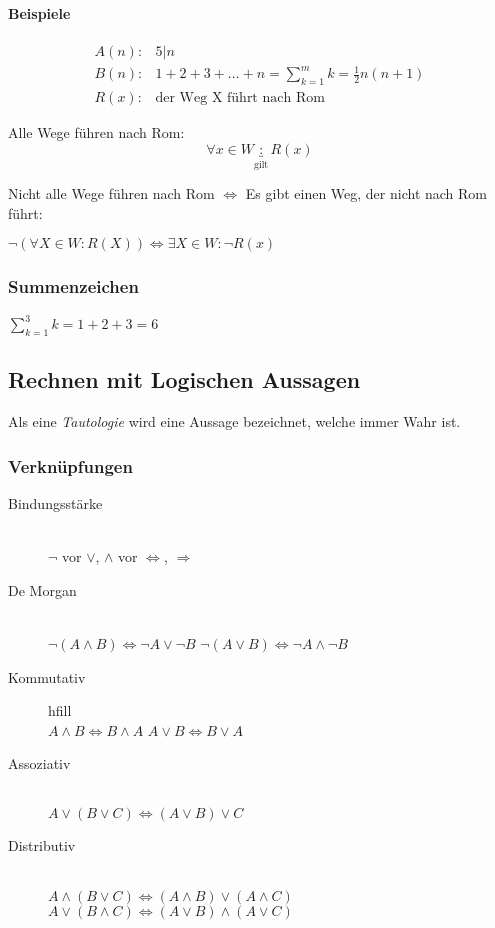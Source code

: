 \begin{multicols}{2}
	\paragraph{Beispiele}
		\begin{align*}
		A(n): & 5 | n \\
		B(n): & 1+2+3+\dots+n = \sum_{k=1}^{m}k = \frac{1}{2} n (n+1) \\
		R(x): & \text{der Weg X führt nach Rom}
		\end{align*}
		
		Alle Wege führen nach Rom:
		\[
		\forall x \in W \underbracket{:}_\text{gilt} R(x)
		\]
		
		Nicht alle Wege führen nach Rom $\Leftrightarrow$ Es gibt einen Weg, der nicht nach Rom führt:
		
		$\neg \left(\forall X \in W : R\left(X\right)\right) \Leftrightarrow \exists X \in W : \neg R(x)$
	

\subsubsection{Summenzeichen}

	$ \sum_{k=1}^{3} k = 1+2+3 = 6$

\subsection{Rechnen mit Logischen Aussagen}

Als eine \emph{Tautologie} wird eine Aussage bezeichnet, welche immer Wahr ist.

	
\subsubsection{Verknüpfungen}

	\begin{description}

		\item[Bindungsstärke] \hfill \\$\neg$ vor $\lor$, $\land$ vor $\Leftrightarrow$, $\Rightarrow$
		\item[De Morgan]\hfill \\ $\neg (A \land B) \Leftrightarrow \neg A \lor \neg B$ \newline $\neg (A \lor B) \Leftrightarrow \neg A \land \neg B$
		\item[Kommutativ] hfill \\ $A \land B \Leftrightarrow B \land A$ $A \lor B \Leftrightarrow B \lor A$
		\item[Assoziativ] \hfill \\ $A \lor (B \lor C) \Leftrightarrow (A \lor B) \lor C$
		\item[Distributiv] \hfill \\ $A \land (B \lor C) \Leftrightarrow (A \land B) \lor (A \land C)$ \newline $A \lor (B \land C) \Leftrightarrow (A \lor B) \land (A \lor C)$ 


\end{description}
\end{multicols}
